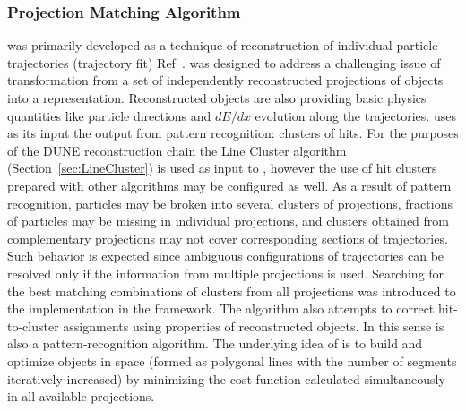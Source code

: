 \subsubsection{Projection Matching Algorithm}\label{sec:PMA}
  was primarily developed as a technique of \threed reconstruction of individual particle trajectories (trajectory fit) Ref~\cite{Antonello:2012hu}.  was designed to address a challenging issue of transformation from a set of independently reconstructed \twod projections of objects into a \threed representation. Reconstructed \threed objects are also providing  basic physics quantities like particle directions and $dE/dx$ evolution along the trajectories.  uses as its input the output from \twod pattern recognition: clusters of hits. For the purposes of the DUNE reconstruction chain the Line Cluster algorithm (Section~\ref{sec:LineCluster}) is used as input to , however the use of hit clusters prepared with other algorithms may be configured as well. As a result of \twod pattern recognition, particles may be broken into several clusters of \twod projections, fractions of particles may be missing in individual projections, and clusters obtained from complementary projections %
may not cover corresponding sections of trajectories. Such behavior is expected since ambiguous configurations of trajectories can be resolved only if the information from multiple \twod projections is used. Searching for the best matching combinations of clusters from all \twod projections was introduced to the  implementation in the  framework. The algorithm also attempts to correct hit-to-cluster assignments using properties of \threed reconstructed objects. In this sense  is also a pattern-recognition algorithm.
The underlying idea of  is to build and optimize objects in \threed space (formed as polygonal lines with %
the number of segments iteratively increased) by minimizing the cost function calculated simultaneously in all available \twod projections. %
